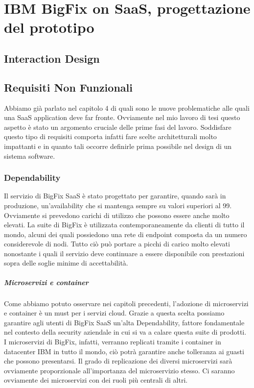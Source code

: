 \chapter{IBM BigFix on SaaS, progettazione del prototipo}

\section{Interaction Design}

\section{Requisiti Non Funzionali}
Abbiamo già parlato nel capitolo 4 di quali sono le nuove problematiche alle quali una SaaS application deve far fronte. Ovviamente nel mio lavoro di tesi questo aspetto è stato un argomento cruciale delle prime fasi del lavoro. Soddisfare questo tipo di requisiti comporta infatti fare scelte architetturali molto impattanti e in quanto tali occorre definirle prima possibile nel design di un sistema software. 
\subsection{Dependability}
	
	
	
	

Il servizio di BigFix SaaS è stato progettato per garantire, quando sarà in produzione, un'availability che si mantenga sempre su valori superiori al 99. Ovviamente si prevedono carichi di utilizzo che possono essere anche molto elevati. La suite di BigFix è utilizzata contemporaneamente da clienti di tutto il mondo, alcuni dei quali possiedono una rete di endpoint composta da un numero considerevole di nodi. Tutto ciò può portare a picchi di carico molto elevati nonostante i quali il servizio deve continuare a essere disponibile con prestazioni sopra delle soglie minime di accettabilità.

\paragraph{Microservizi e container}
Come abbiamo potuto osservare nei capitoli precedenti, l'adozione di microservizi e container è un must per i servizi cloud. Grazie a questa scelta possiamo garantire agli utenti di BigFix SaaS un'alta Dependability, fattore fondamentale nel contesto della security aziendale in cui si va a calare questa suite di prodotti. I microservizi di BigFix, infatti, verranno replicati tramite i container in datacenter IBM in tutto il mondo, ciò potrà garantire anche tolleranza ai guasti che possono presentarsi. Il grado di replicazione dei diversi microservizi sarà ovviamente proporzionale all'importanza del microservizio stesso. Ci saranno ovviamente dei microservizi con dei ruoli più centrali di altri.


